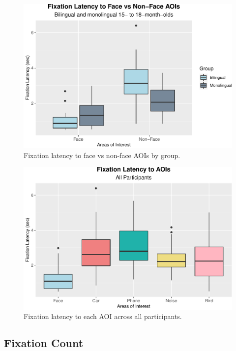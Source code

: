 \documentclass[english,man,floatsintext]{apa6}
\begin{document}
\begin{figure}
\includegraphics{Effects_of_early_language_experience_on_infants_files/figure-latex/latencyplot-1} \caption{Fixation latency to face vs non-face AOIs by group.}\label{fig:latencyplot}
\end{figure}

\begin{figure}
\includegraphics{Effects_of_early_language_experience_on_infants_files/figure-latex/lat5plot-1} \caption{Fixation latency to each AOI across all participants.}\label{fig:lat5plot}
\end{figure}

\hypertarget{fixation-count}{%
\subsection{Fixation Count}\label{fixation-count}}
\end{document}
